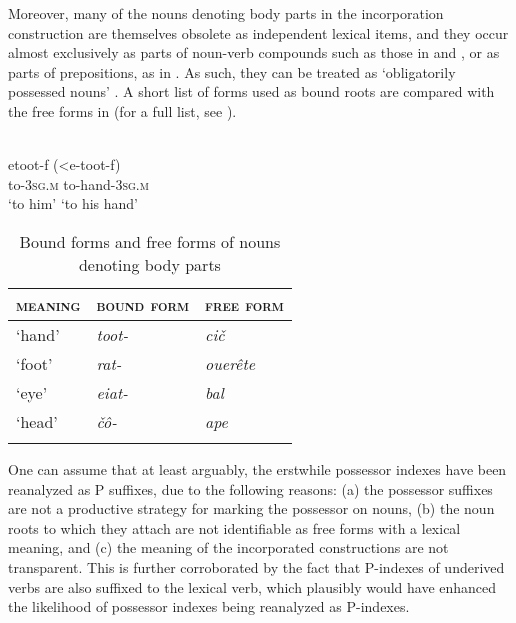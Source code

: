 \documentclass[output=paper]{LSP/langsci}
\begin{document}
Moreover, many of the nouns denoting body parts in the incorporation construction are themselves obsolete as independent lexical items, and they occur almost exclusively as parts of noun-verb compounds such as those in  and , or as parts of prepositions, as in . As such, they can be treated as ‘obligatorily possessed nouns’ \citep{Nicholsetal2005Possessive}. A short list of forms used as bound roots are compared with the free forms in  (for a full list, see \citealt[102--104]{Layton2004Coptic}).

\begin{exe}
\ex%
\label{05-gr-ex:30}
\\
\gll etoot-f (<e-toot-f)\\
 to-\textsc{3sg.m} to-hand-\textsc{3sg.m}\\
\glt ‘to him’{ }{ }{ }{ } ‘to his hand’ 
\end{exe}

\begin{table}
\begin{tabular}{lll}
\lsptoprule
\textsc{meaning} & \textsc{bound form} & \textsc{free form}\\
\midrule
‘hand’ & \textit{toot-} & \textit{ci}\textit{č}\\
‘foot’ & \textit{rat-} & \textit{ouerête}\\
‘eye’ & \textit{eiat-} & \textit{bal}\\
‘head’ & \textit{čô-} & \textit{ape}\\
\lspbottomrule
\end{tabular}
\caption{Bound forms and free forms of nouns denoting body parts}\label{05-gr-tab:4}
\end{table}

One can assume that at least arguably, the erstwhile possessor indexes have been reanalyzed as P suffixes, due to the following reasons: (a) the possessor suffixes are not a productive strategy for marking the possessor on nouns, (b) the noun roots to which they attach are not identifiable as free forms with a lexical meaning, and (c) the meaning of the incorporated constructions are not transparent. This is further corroborated by the fact that P-indexes of underived verbs are also suffixed to the lexical verb, which plausibly would have enhanced the likelihood of possessor indexes being reanalyzed as P-indexes.
\end{document}

